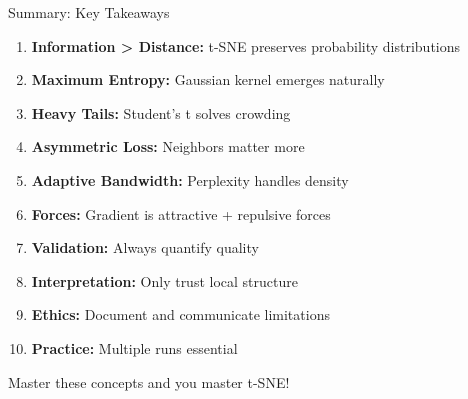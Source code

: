 \documentclass[aspectratio=169]{beamer}
\begin{document}
\begin{frame}{Summary: Key Takeaways}
\begin{enumerate}
\item \textbf{Information > Distance:} t-SNE preserves probability distributions
\item \textbf{Maximum Entropy:} Gaussian kernel emerges naturally
\item \textbf{Heavy Tails:} Student's t solves crowding
\item \textbf{Asymmetric Loss:} Neighbors matter more
\item \textbf{Adaptive Bandwidth:} Perplexity handles density
\item \textbf{Forces:} Gradient is attractive + repulsive forces
\item \textbf{Validation:} Always quantify quality
\item \textbf{Interpretation:} Only trust local structure
\item \textbf{Ethics:} Document and communicate limitations
\item \textbf{Practice:} Multiple runs essential
\end{enumerate}

\colorbox{green!30}{Master these concepts and you master t-SNE!}
\end{frame}
\end{document}
